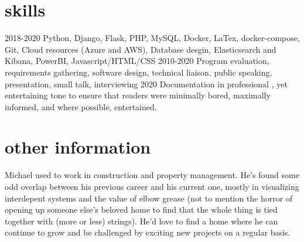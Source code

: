 \documentclass[]{twentysecondcv}
\begin{document}
\section{skills}
	\begin{twentyshort}
	\twentyitemshort
	{2018-2020}
	{Python, Django, Flask, PHP, MySQL, Docker, LaTex, docker-compose, Git, Cloud resources (Azure and AWS), Database desgin, Elasticsearch and Kibana, PowerBI, Javascript/HTML/CSS}
	\twentyitemshort
	{2010-2020}
	{Program evaluation, requirements gathering, software design, technical liaison, public speaking, presentation, small talk, interviewing}
	\twentyitemshort
	{2020}
	{Documentation in  professional , yet entertaining tone to ensure that readers were minimally bored, maximally informed, and where possible, entertained.}
	\end{twentyshort}
\section{other information}
Michael used to work in construction and property management. He's found some odd overlap between his previous career and his current one, mostly in visualizing interdepent systems and the value of elbow grease (not to mention the horror of opening up someone else's beloved home to find that the whole thing is tied together with (more or less) strings). He'd love to find a home where he can continue to grow and be challenged by exciting new projects on a regular basis.

\end{document}
